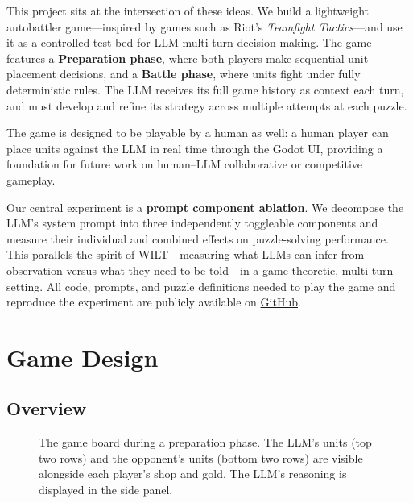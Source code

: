 \documentclass[11pt]{article}
\begin{document}
This project sits at the intersection of these ideas.
We build a lightweight autobattler game---inspired by games such as Riot's \emph{Teamfight Tactics}---and use it as a controlled test bed for LLM multi-turn decision-making.
The game features a \textbf{Preparation phase}, where both players make sequential unit-placement decisions, and a \textbf{Battle phase}, where units fight under fully deterministic rules.
The LLM receives its full game history as context each turn, and must develop and refine its strategy across multiple attempts at each puzzle.

The game is designed to be playable by a human as well: a human player can place units against the LLM in real time through the Godot UI, providing a foundation for future work on human--LLM collaborative or competitive gameplay.

Our central experiment is a \textbf{prompt component ablation}.
We decompose the LLM's system prompt into three independently toggleable components and measure their individual and combined effects on puzzle-solving performance.
This parallels the spirit of WILT---measuring what LLMs can infer from observation versus what they need to be told---in a game-theoretic, multi-turn setting.
All code, prompts, and puzzle definitions needed to play the game and reproduce the experiment are publicly available on \href{https://github.com/JadonJZhu/interactive-puzzle-solving}{GitHub}.

\section{Game Design}\label{sec:game}

\subsection{Overview}

\begin{figure}[h]
\centering
\caption{The game board during a preparation phase. The LLM's units (top two rows) and the opponent's units (bottom two rows) are visible alongside each player's shop and gold. The LLM's reasoning is displayed in the side panel.}
\label{fig:game-board}
\end{figure}
\end{document}
